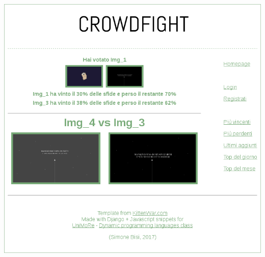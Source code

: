 \documentclass{scrreprt}
\begin{document}
\centerline{\includegraphics[scale=0.40]{vote}}

\pagebreak
\end{document}
